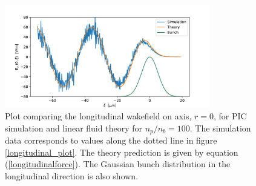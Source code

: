 \vspace{-50pt}
\begin{figure}
\centering
\includegraphics[width=0.8\textwidth]{test2.pdf}
\caption{\small{Plot comparing the longitudinal wakefield on axis, $r=0$, for PIC simulation and linear fluid theory for $n_p/n_b=100$. The simulation data corresponds to values along the dotted line in figure \ref{longitudinal_plot}. The theory prediction is given by equation  (\ref{longitudinalforce}). The Gaussian bunch distribution in the longitudinal direction is also shown.}}
\label{theory_vs_simulation_longitudinal}
\end{figure}\vspace{50pt}
